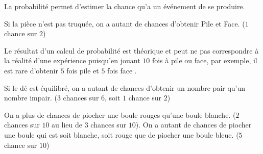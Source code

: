 \documentclass[a4paper,10pt]{report}
\begin{document}
\vspace{-3mm}
\begin{defn}
La probabilité permet d'estimer la chance qu'a un événement de se produire.
\end{defn}

\setcounter{cex}{0}
\begin{ex}
\vspace{-4.5mm}\hspace{2.8cm} Si la pièce n'est pas truquée, on a autant de chances d'obtenir Pile et Face. ($1$ chance sur $2$)
\end{ex}

\vspace{-1mm}
\begin{rem}
\vspace{-4.5mm}\hspace{2.8cm} Le résultat d'un calcul de probabilité est théorique et peut ne pas correspondre à la réalité d'une expérience puisqu'en jouant $10$ fois à pile ou face, par exemple, il est rare d'obtenir $5$ fois \og pile \fg{} et $5$ fois \og face \fg{}.
\end{rem}

\vspace{-1mm}
\begin{ex}
\vspace{-4.5mm}\hspace{2.8cm} Si le dé est équilibré, on a autant de chances d'obtenir un nombre pair qu'un nombre impair. ($3$ chances sur $6$, soit $1$ chance sur $2$)
\end{ex}

\vspace{-1mm}
\begin{ex}
\vspace{-4.5mm}\hspace{2.8cm} On a plus de chances de piocher une boule rouges qu'une boule blanche. ($2$ chances sur $10$ au lieu de $3$ chances sur $10$). On a autant de chances de piocher une boule qui est soit blanche, soit rouge que de piocher une boule bleue. ($5$ chance sur $10$)
\end{ex}
\end{document}
